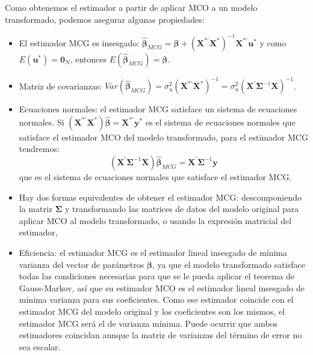 
Como obtenemos el estimador a partir de aplicar MCO a un modelo transformado,
podemos asegurar algunas propiedades:
\begin{itemize}
\item El estimador MCG es insesgado: $\hat{\boldsymbol{\beta}}_{MCG}=\boldsymbol{\beta}+\left(\boldsymbol{X}^{*\prime}\boldsymbol{X}^{*}\right)^{-1}\boldsymbol{X}^{*\prime}\boldsymbol{u}^{*}$
y como $E\left(\boldsymbol{u}^{*}\right)=\boldsymbol{0}_{N}$, entonces
$E\left(\hat{\boldsymbol{\beta}}_{MCG}\right)=\boldsymbol{\beta}$.
\item Matriz de covarianzas: $Var\left(\hat{\boldsymbol{\beta}}_{MCG}\right)=\sigma_{u}^{2}\left(\boldsymbol{X}^{*\prime}\boldsymbol{X}^{*}\right)^{-1}=\sigma_{u}^{2}\left(\boldsymbol{X}^{\prime}\boldsymbol{\Sigma}^{-1}\boldsymbol{X}\right)^{-1}$.
\item Ecuaciones normales: el estimador MCG satisface un sistema de ecuaciones
normales. Si $\left(\boldsymbol{X}^{*\prime}\boldsymbol{X}^{*}\right)\hat{\boldsymbol{\beta}}=\boldsymbol{X}^{*\prime}\boldsymbol{y}^{*}$
es el sistema de ecuaciones normales que satisface el estimador MCO
del modelo transformado, para el estimador MCG tendremos:
\[
\left(\boldsymbol{X}^{\prime}\boldsymbol{\Sigma}^{-1}\boldsymbol{X}\right)\hat{\boldsymbol{\beta}}_{MCG}=\boldsymbol{X}^{\prime}\boldsymbol{\Sigma}^{-1}\boldsymbol{y}
\]
 que es el sistema de ecuaciones normales que satisface el estimador
MCG.
\item Hay dos formas equivalentes de obtener el estimador MCG: descomponiendo
la matriz $\boldsymbol{\Sigma}$ y transformando las matrices de datos
del modelo original para aplicar MCO al modelo transformado, o usando
la expresi\'on matricial del estimador,
\item Eficiencia: el estimador MCG es el estimador lineal insesgado de m\'inima
varianza del vector de par\'ametros $\boldsymbol{\beta}$, ya que el
modelo transformado satisface todas las condiciones necesarias para
que se le pueda aplicar el teorema de Gauss-Markov, as\'i que su estimador
MCO es el estimador lineal insesgado de m\'inima varianza para sus coeficientes.
Como ese estimador coincide con el estimador MCG del modelo original
y los coeficientes son los mismos, el estimador MCG ser\'a el de varianza
m\'inima. Puede ocurrir que ambos estimadores coincidan aunque la matriz
de varianzas del t\'ermino de error no sea escalar.
\end{itemize}

